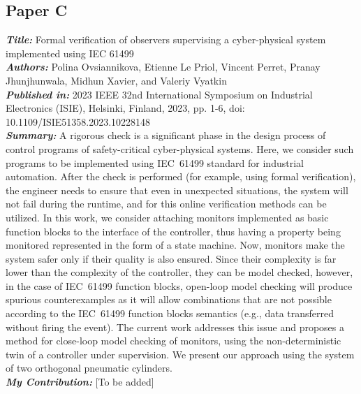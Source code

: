 \subsection{Paper C}
\textbf{\textit{Title:}} Formal verification of observers supervising a cyber-physical system implemented using IEC 61499\\
\textbf{\textit{Authors:}} Polina Ovsiannikova, Etienne Le Priol, Vincent Perret, Pranay Jhunjhunwala, Midhun Xavier, and Valeriy Vyatkin\\
\textbf{\textit{Published in:}} 2023 IEEE 32nd International Symposium on Industrial Electronics (ISIE), Helsinki, Finland, 2023, pp. 1-6, doi: 10.1109/ISIE51358.2023.10228148\\
\textbf{\textit{Summary:}} A rigorous check is a significant phase in the design process of control programs of safety-critical cyber-physical systems. Here, we consider such programs to be implemented using IEC~61499 standard for industrial automation. After the check is performed (for example, using formal verification), the engineer needs to ensure that even in unexpected situations, the system will not fail during the runtime, and for this online verification methods can be utilized. In this work, we consider attaching monitors implemented as basic function blocks to the interface of the controller, thus having a property being monitored represented in the form of a state machine. Now, monitors make the system safer only if their quality is also ensured. Since their complexity is far lower than the complexity of the controller, they can be model checked, however, in the case of IEC~61499 function blocks, open-loop model checking will produce spurious counterexamples as it will allow combinations that are not possible according to the IEC~61499 function blocks semantics (e.g., data transferred without firing the event). The current work addresses this issue and proposes a method for close-loop model checking of monitors, using the non-deterministic twin of a controller under supervision. We present our approach using the system of two orthogonal pneumatic cylinders.\\
\textbf{\textit{My Contribution:}} [To be added]

